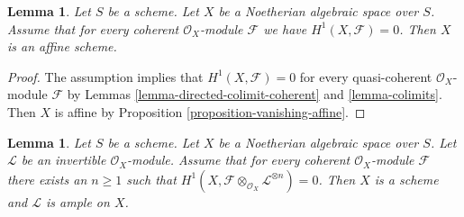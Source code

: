 \documentclass{stacks-project}
\theoremstyle{plain}
\newtheorem{lemma}[subsection]{Lemma}
\theoremstyle{definition}
\theoremstyle{remark}
\numberwithin{equation}{subsection}
\begin{document}
\begin{lemma}
\label{lemma-Noetherian-h1-zero}
Let $S$ be a scheme. Let $X$ be a Noetherian algebraic space over $S$.
Assume that for every coherent $\mathcal{O}_X$-module
$\mathcal{F}$ we have $H^1(X, \mathcal{F}) = 0$.
Then $X$ is an affine scheme.
\end{lemma}

\begin{proof}
The assumption implies that $H^1(X, \mathcal{F}) = 0$ for every quasi-coherent
$\mathcal{O}_X$-module $\mathcal{F}$ by
Lemmas \ref{lemma-directed-colimit-coherent} and \ref{lemma-colimits}.
Then $X$ is affine by
Proposition \ref{proposition-vanishing-affine}.
\end{proof}

\begin{lemma}
\label{lemma-Noetherian-h1-zero-invertible}
Let $S$ be a scheme. Let $X$ be a Noetherian algebraic space over $S$.
Let $\mathcal{L}$ be an invertible $\mathcal{O}_X$-module.
Assume that for every coherent $\mathcal{O}_X$-module
$\mathcal{F}$ there exists an $n \geq 1$ such that
$H^1(X, \mathcal{F} \otimes_{\mathcal{O}_X} \mathcal{L}^{\otimes n}) = 0$.
Then $X$ is a scheme and $\mathcal{L}$ is ample on $X$.
\end{lemma}
\end{document}
